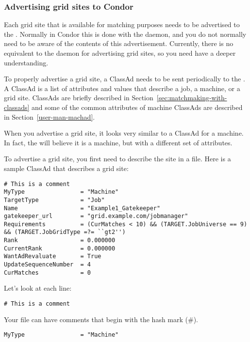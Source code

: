 \subsubsection{Advertising grid sites to Condor}

Each grid site that is available for matching purposes needs to be
advertised to the . Normally in Condor this is done
with the  daemon, and you do not normally need to be
aware of the contents of this advertisement. Currently, there is no
equivalent to the  daemon for advertising grid sites,
so you need have a deeper understanding.

To properly advertise a grid site, a ClassAd needs to be sent
periodically to the . A ClassAd is a list of
attributes and values that describe a job, a machine, or a grid
site. ClassAds are briefly described in
Section~\ref{sec:matchmaking-with-classads} and some of the common
attributes of machine ClassAds are described in
Section~\ref{user-man-machad}.

When you advertise a grid site, it looks very similar to a ClassAd for
a machine. In fact, the  will believe it is a
machine, but with a different set of attributes. 

To advertise a grid site, you first need to describe the site in a
file. Here is a sample ClassAd that describes a grid site:

\footnotesize
\begin{verbatim}
# This is a comment
MyType                = "Machine"
TargetType            = "Job"
Name                  = "Example1_Gatekeeper"
gatekeeper_url        = "grid.example.com/jobmanager"
Requirements          = (CurMatches < 10) && (TARGET.JobUniverse == 9) && (TARGET.JobGridType =?= ``gt2'')
Rank                  = 0.000000
CurrentRank           = 0.000000
WantAdRevaluate       = True
UpdateSequenceNumber  = 4
CurMatches            = 0
\end{verbatim}
\normalsize

Let's look at each line:

\begin{verbatim}
# This is a comment
\end{verbatim}

Your file can have comments that begin with the hash mark (\#). 

\begin{verbatim}
MyType                = "Machine"
\end{verbatim}

